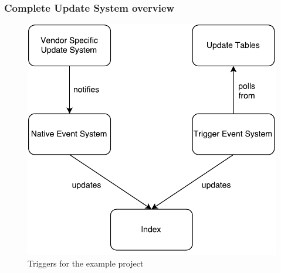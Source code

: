\subsubsection{Complete Update System overview}


\begin{figure}[ht]
	\centering
	\includegraphics[scale=0.6]{images/UpdateConsumer_Architecture.pdf}
	\caption{Triggers for the example project}
	\label{updateconsumer_architecture}
\end{figure}

\pagebreak
